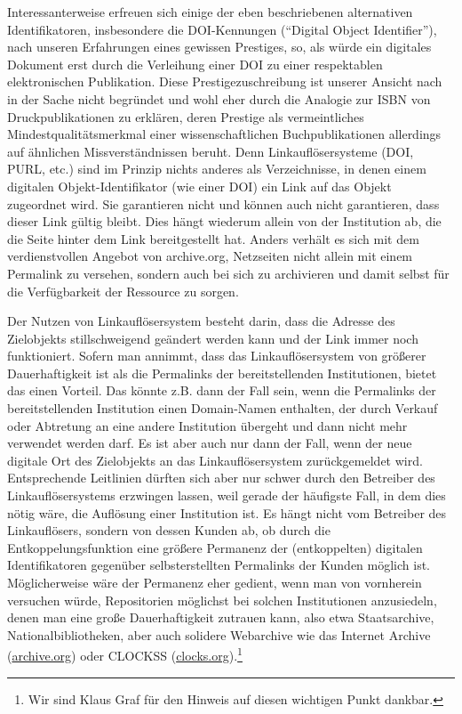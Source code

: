 \documentclass[12pt, a4paper]{article}
\begin{document}
Interessanterweise erfreuen sich einige der eben beschriebenen
alternativen Identifikatoren, insbesondere die DOI-Kennungen
("`Digital Object Identifier"'), nach unseren Erfahrungen eines
gewissen Prestiges, so, als würde ein digitales Dokument erst durch
die Verleihung einer DOI zu einer respektablen elektronischen
Publikation. Diese Prestigezuschreibung ist unserer Ansicht nach in
der Sache nicht begründet und wohl eher durch die Analogie zur ISBN
von Druckpublikationen zu erklären, deren Prestige als vermeintliches
Mindestqualitätsmerkmal einer wissenschaftlichen Buchpublikationen
allerdings auf ähnlichen Missverständnissen beruht. Denn
Linkauflösersysteme (DOI, PURL, etc.) sind im Prinzip nichts anderes
als Verzeichnisse, in denen einem digitalen Objekt-Identifikator (wie
einer DOI) ein Link auf das Objekt zugeordnet wird. Sie garantieren
nicht und können auch nicht garantieren, dass dieser Link gültig
bleibt. Dies hängt wiederum allein von der Institution ab, die die
Seite hinter dem Link bereitgestellt hat.
Anders verhält es sich mit dem verdienstvollen Angebot von archive.org,
Netzseiten nicht allein mit einem Permalink zu versehen, sondern auch
bei sich zu archivieren und damit selbst für die Verfügbarkeit der Ressource
zu sorgen.

Der Nutzen von Linkauflösersystem besteht darin, dass die Adresse des
Zielobjekts stillschweigend geändert werden kann und der Link immer
noch funktioniert. Sofern man annimmt, dass das Linkauflösersystem von
größerer Dauerhaftigkeit ist als die Permalinks der bereitstellenden
Institutionen, bietet das einen Vorteil. Das könnte z.B. dann der Fall
sein, wenn die Permalinks der bereitstellenden Institution einen
Domain-Namen enthalten, der durch Verkauf oder Abtretung an eine
andere Institution übergeht und dann nicht mehr verwendet werden
darf. Es ist aber auch nur dann der Fall, wenn der neue digitale Ort
des Zielobjekts an das Linkauflösersystem zurückgemeldet
wird. Entsprechende Leitlinien dürften sich aber nur schwer durch den
Betreiber des Linkauflösersystems erzwingen lassen, weil gerade der
häufigste Fall, in dem dies nötig wäre, die Auflösung einer
Institution ist. Es hängt nicht vom Betreiber des Linkauflösers,
sondern von dessen Kunden ab, ob durch die Entkoppelungsfunktion eine
größere Permanenz der (entkoppelten) digitalen Identifikatoren
gegenüber selbsterstellten Permalinks der Kunden möglich
ist. Möglicherweise wäre der Permanenz eher gedient, wenn man von
vornherein versuchen würde, Repositorien möglichst bei solchen
Institutionen anzusiedeln, denen man eine große Dauerhaftigkeit
zutrauen kann, also etwa Staatsarchive, Nationalbibliotheken, aber
auch solidere Webarchive wie das Internet Archive
(\href{https://archive.org}{archive.org}) oder CLOCKSS
(\href{https://clocks.org}{clocks.org}).\footnote{Wir sind Klaus Graf
  für den Hinweis auf diesen wichtigen Punkt dankbar.}
\end{document}
